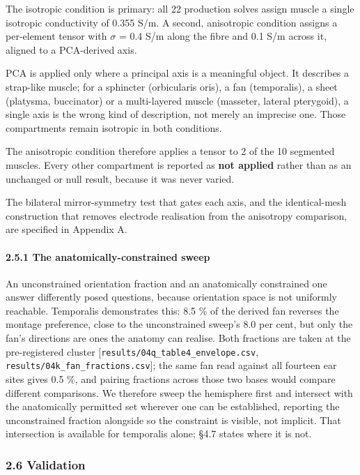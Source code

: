 \documentclass[manuscript,review,anonymous]{acmart}
\begin{document}
The isotropic condition is primary: all 22 production solves assign muscle a
single isotropic conductivity of 0.355 S/m. A second, anisotropic condition
assigns a per-element tensor with $\sigma$ = 0.4 S/m along the fibre and 0.1 S/m across
it, aligned to a PCA-derived axis.

PCA is applied only where a principal axis is a meaningful object. It describes
a strap-like muscle; for a sphincter (orbicularis oris), a fan (temporalis), a
sheet (platysma, buccinator) or a multi-layered muscle (masseter, lateral
pterygoid), a single axis is the wrong kind of description, not merely an
imprecise one. Those compartments remain isotropic in both conditions.

The anisotropic condition therefore applies a tensor to 2 of the 10 segmented
muscles. Every other compartment is reported as \textbf{not applied} rather than as
an unchanged or null result, because it was never varied.

The bilateral mirror-symmetry test that gates each axis, and the identical-mesh construction that removes electrode realisation from the anisotropy comparison, are specified in Appendix A.

\paragraph{2.5.1 The anatomically-constrained sweep}\label{the-anatomically-constrained-sweep}

An unconstrained orientation fraction and an anatomically constrained one
answer differently posed questions, because orientation space is not uniformly
reachable. Temporalis demonstrates this: 8.5 \% of the derived fan reverses the
montage preference, close to the unconstrained sweep's 8.0 per cent, but only
the fan's directions are ones the anatomy can realise. Both fractions are taken at the pre-registered cluster
{[}\texttt{results/04q\_table4\_envelope.csv}, \texttt{results/04k\_fan\_fractions.csv}{]}; the same
fan read against all fourteen ear sites gives 0.5 \%, and pairing fractions
across those two bases would compare different comparisons. We therefore sweep
the hemisphere first and intersect with the anatomically permitted set wherever
one can be established, reporting the unconstrained fraction alongside so the
constraint is visible, not implicit. That intersection is available for
temporalis alone; \S{}4.7 states where it is not.

\subsubsection{2.6 Validation}\label{validation}
\end{document}
